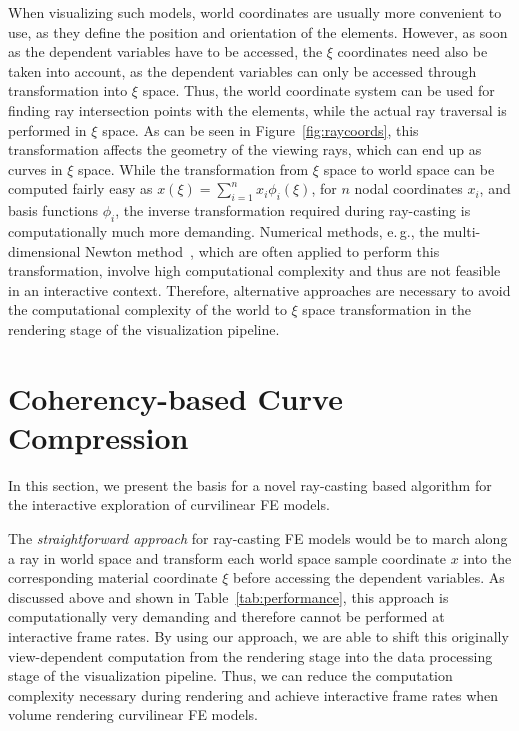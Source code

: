 \documentclass[journal]{vgtc}                %
\begin{document}
When visualizing such models, world coordinates are usually more convenient to use, as they define the position and orientation of the elements. However, as soon as the dependent variables have to be accessed, the $\xi$ coordinates need also be taken into account, as the dependent variables can only be accessed through transformation into $\xi$ space. Thus, the world coordinate system can be used for finding ray intersection points with the elements, while the actual ray traversal is performed in $\xi$ space. As can be seen in Figure~\ref{fig:raycoords}, this transformation affects the geometry of the viewing rays, which can end up as curves in $\xi$ space. While the transformation from $\xi$ space to world space can be computed fairly easy as $x(\xi)=\sum_{i=1}^n x_i \phi_i(\xi)$, for $n$ nodal coordinates $x_i$, and basis functions $\phi_i$, the inverse transformation required during ray-casting is computationally much more demanding. Numerical methods, e.\,g., the multi-dimensional Newton method~\cite{Press92}, which are often applied to perform this transformation, involve high computational complexity and thus are not feasible in an interactive context. Therefore, alternative approaches are necessary to avoid the computational complexity of the world to $\xi$ space transformation in the rendering stage of the visualization pipeline.

\section{Coherency-based Curve Compression}\label{sec:preprocessing}

In this section, we present the basis for a novel ray-casting based algorithm for the interactive exploration of curvilinear FE models.

The \emph{straightforward approach} for ray-casting FE models would be to march along a ray in world space and transform each world space sample coordinate $x$ into the corresponding material coordinate $\xi$ before accessing the dependent variables. As discussed above and shown in Table~\ref{tab:performance}, this approach is computationally very demanding and therefore cannot be performed at interactive frame rates. By using our approach, we are able to shift this originally view-dependent computation from the rendering stage into the data processing stage of the visualization pipeline. Thus, we can reduce the computation complexity necessary during rendering and achieve interactive frame rates when volume rendering curvilinear FE models.
\end{document}
